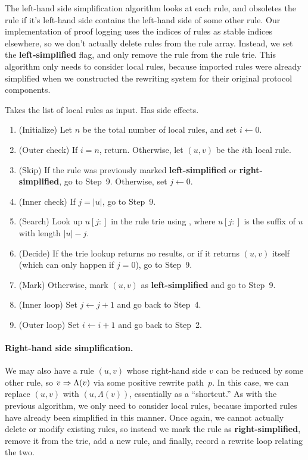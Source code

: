 \documentclass[../generics]{subfiles}
\begin{document}
The left-hand side simplification algorithm looks at each rule, and obsoletes the rule if it's left-hand side contains the left-hand side of some other rule. Our implementation of proof logging uses the indices of rules as stable indices elsewhere, so we don't actually delete rules from the rule array. Instead, we set the \textbf{left-simplified} flag, and only remove the rule from the rule trie. This algorithm only needs to consider local rules, because imported rules were already simplified when we constructed the rewriting system for their original protocol components.
\begin{algorithm}\label{alg:simplify left}
Takes the list of local rules as input. Has side effects.
\begin{enumerate}
\item (Initialize) Let $n$ be the total number of local rules, and set $i \leftarrow 0$.
\item (Outer check) If $i=n$, return. Otherwise, let $(u, v)$ be the $i$th local rule.
\item (Skip) If the rule was previously marked \textbf{left-simplified} or \textbf{right-simplified}, go to Step~9. Otherwise, set $j \leftarrow 0$.
\item (Inner check) If $j=|u|$, go to Step~9.
\item (Search) Look up $u[j:]$ in the rule trie using , where $u[j:]$ is the suffix of $u$ with length $|u|-j$.
\item (Decide) If the trie lookup returns no results, or if it returns $(u, v)$ itself (which can only happen if $j=0$), go to Step~9.
\item (Mark) Otherwise, mark $(u, v)$ as \textbf{left-simplified} and go to Step~9.
\item (Inner loop) Set $j\leftarrow j+1$ and go back to Step~4.
\item (Outer loop) Set $i\leftarrow i+1$ and go back to Step~2.
\end{enumerate}
\end{algorithm}

\paragraph{Right-hand side simplification.} We may also have a rule $(u, v)$ whose right-hand side $v$ can be reduced by some other rule, so $v\Rightarrow \Lambda(v)$ via some positive rewrite path~$p$. In this case, we can replace $(u, v)$ with $(u, \Lambda(v))$, essentially as a ``shortcut.'' As with the previous algorithm, we only need to consider local rules, because imported rules have already been simplified in this manner. Once again, we cannot actually delete or modify existing rules, so instead we mark the rule as \textbf{right-simplified}, remove it from the trie, add a new rule, and finally, record a rewrite loop relating the two.
\end{document}
